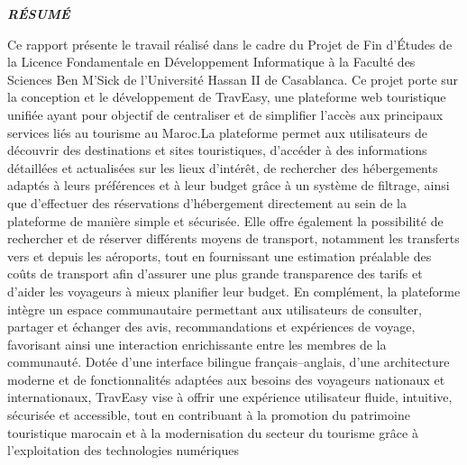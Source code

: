 \documentclass[a4paper,12pt]{report}
\begin{document}
\newpage
{}
\vspace*{0.5cm}
\begin{center}
    {\LARGE\textbf{\textit{RÉSUMÉ }}}
\end{center}
Ce rapport présente le travail réalisé dans le cadre du Projet de Fin d'Études de la Licence Fondamentale en Développement Informatique à la Faculté des Sciences Ben M'Sick de l'Université Hassan II de Casablanca.
Ce projet porte sur la conception et le développement de TravEasy, une plateforme web touristique unifiée ayant pour objectif de centraliser et de simplifier l'accès aux principaux services liés au tourisme au Maroc.La plateforme permet aux utilisateurs de découvrir des destinations et sites touristiques, d'accéder à des informations détaillées et actualisées sur les lieux d'intérêt, de rechercher des hébergements adaptés à leurs préférences et à leur budget grâce à un système de filtrage, ainsi que d'effectuer des réservations d'hébergement directement au sein de la plateforme de manière simple et sécurisée. Elle offre également la possibilité de rechercher et de réserver différents moyens de transport, notamment les transferts vers et depuis les aéroports, tout en fournissant une estimation préalable des coûts de transport afin d'assurer une plus grande transparence des tarifs et d'aider les voyageurs à mieux planifier leur budget. En complément, la plateforme intègre un espace communautaire permettant aux utilisateurs de consulter, partager et échanger des avis, recommandations et expériences de voyage, favorisant ainsi une interaction enrichissante entre les membres de la communauté. Dotée d'une interface bilingue français–anglais, d'une architecture moderne et de fonctionnalités adaptées aux besoins des voyageurs nationaux et internationaux, TravEasy vise à offrir une expérience utilisateur fluide, intuitive, sécurisée et accessible, tout en contribuant à la promotion du patrimoine touristique marocain et à la modernisation du secteur du tourisme grâce à l'exploitation des technologies numériques
\vspace{2cm}
\end{document}
